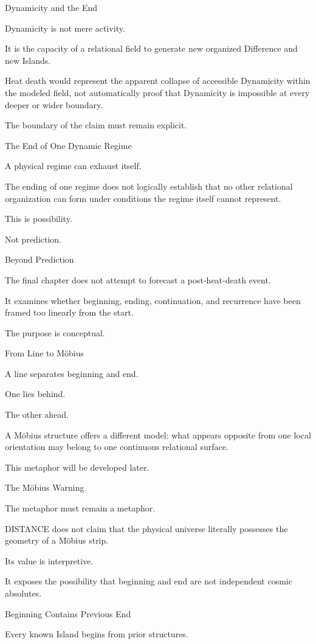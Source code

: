 Dynamicity and the End

Dynamicity is not mere activity.

It is the capacity of a relational field to generate new organized Difference and new Islands.

Heat death would represent the apparent collapse of accessible Dynamicity within the modeled field, not automatically proof that Dynamicity is impossible at every deeper or wider boundary.

The boundary of the claim must remain explicit.

The End of One Dynamic Regime

A physical regime can exhaust itself.

The ending of one regime does not logically establish that no other relational organization can form under conditions the regime itself cannot represent.

This is possibility.

Not prediction.

Beyond Prediction

The final chapter does not attempt to forecast a post-heat-death event.

It examines whether beginning, ending, continuation, and recurrence have been framed too linearly from the start.

The purpose is conceptual.

From Line to Möbius

A line separates beginning and end.

One lies behind.

The other ahead.

A Möbius structure offers a different model: what appears opposite from one local orientation may belong to one continuous relational surface.

This metaphor will be developed later.

The Möbius Warning

The metaphor must remain a metaphor.

DISTANCE does not claim that the physical universe literally possesses the geometry of a Möbius strip.

Its value is interpretive.

It exposes the possibility that beginning and end are not independent cosmic absolutes.

Beginning Contains Previous End

Every known Island begins from prior structures.

